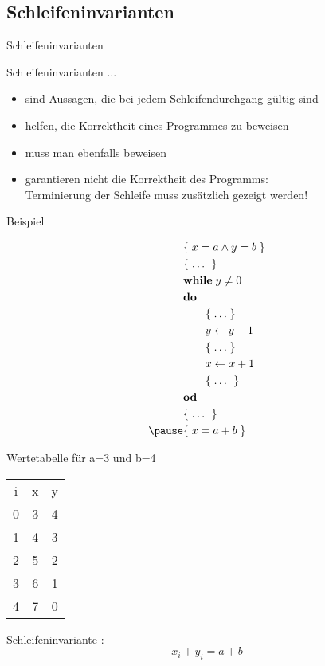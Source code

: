 \subsection{Schleifeninvarianten}
\begin{frame}{Schleifeninvarianten}
	\begin{block}{}
		Schleifeninvarianten ... 
		\begin{itemize}
			\item sind Aussagen, die bei jedem Schleifendurchgang gültig sind
			\item helfen, die Korrektheit eines Programmes zu beweisen
			\item muss man ebenfalls beweisen
			\item garantieren nicht die Korrektheit des Programms:\pause \\
			 Terminierung der Schleife muss zusätzlich gezeigt werden!
		\end{itemize}
	\end{block}
\end{frame}
	
\begin{frame}{Beispiel}
	\begin{minipage}{0.49\linewidth}
	\begin{align*}
		&\assert{x=a \land y=b}  \\
		&\assert{ \dots\ } \\
		&\kw{while } \; y\not=0  \\
		&\kw{do } \\
		&\qquad\assert{ \dots } \\
		&\qquad y \gets y-1 \\
		&\qquad\assert{ \dots } \\
		&\qquad x \gets x+1 \\
		&\qquad\assert{ \dots\ } \\
		&\kw{od } \\
		&\assert{ \dots\ } \\ \pause
		&\assert{x=a+b} \\
	\end{align*}
	\end{minipage} \pause
	\begin{minipage}{0.5\linewidth}
		\begin{block}{Wertetabelle für a=3 und b=4}
			\centering
			\begin{tabular}{ccc}	 
				i & x & y \\
				0 & 3 & 4 \\
				1 & 4 & 3 \\
				2 & 5 & 2 \\
				3 & 6 & 1 \\
				4 & 7 & 0 \\
			\end{tabular}
		\end{block}
		\pause
		Schleifeninvariante : $$ x_i + y_i = a + b $$ 
	\end{minipage}
\end{frame}

